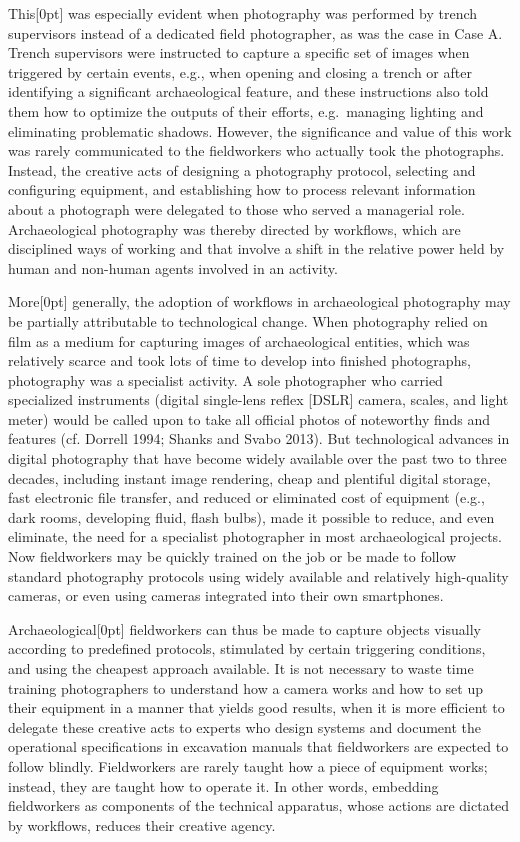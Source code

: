 \documentclass[
]{article}
\newcommand{\paragraphnumber}[1]{\marginnote{\color{lightgray}\tiny{#1}}[0pt]}
\begin{document}
This\paragraphnumber{[59]} was especially evident when photography was
performed by trench supervisors instead of a dedicated field
photographer, as was the case in Case A. Trench supervisors were
instructed to capture a specific set of images when triggered by certain
events, e.g., when opening and closing a trench or after identifying a
significant archaeological feature, and these instructions also told
them how to optimize the outputs of their efforts, e.g.~managing
lighting and eliminating problematic shadows. However, the significance
and value of this work was rarely communicated to the fieldworkers who
actually took the photographs. Instead, the creative acts of designing a
photography protocol, selecting and configuring equipment, and
establishing how to process relevant information about a photograph were
delegated to those who served a managerial role. Archaeological
photography was thereby directed by workflows, which are disciplined
ways of working and that involve a shift in the relative power held by
human and non-human agents involved in an activity.

More\paragraphnumber{[60]} generally, the adoption of workflows in
archaeological photography may be partially attributable to
technological change. When photography relied on film as a medium for
capturing images of archaeological entities, which was relatively scarce
and took lots of time to develop into finished photographs, photography
was a specialist activity. A sole photographer who carried specialized
instruments (digital single-lens reflex {[}DSLR{]} camera, scales, and
light meter) would be called upon to take all official photos of
noteworthy finds and features (cf. Dorrell 1994; Shanks and Svabo 2013).
But technological advances in digital photography that have become
widely available over the past two to three decades, including instant
image rendering, cheap and plentiful digital storage, fast electronic
file transfer, and reduced or eliminated cost of equipment (e.g., dark
rooms, developing fluid, flash bulbs), made it possible to reduce, and
even eliminate, the need for a specialist photographer in most
archaeological projects. Now fieldworkers may be quickly trained on the
job or be made to follow standard photography protocols using widely
available and relatively high-quality cameras, or even using cameras
integrated into their own smartphones.

Archaeological\paragraphnumber{[61]} fieldworkers can thus be made to
capture objects visually according to predefined protocols, stimulated
by certain triggering conditions, and using the cheapest approach
available. It is not necessary to waste time training photographers to
understand how a camera works and how to set up their equipment in a
manner that yields good results, when it is more efficient to delegate
these creative acts to experts who design systems and document the
operational specifications in excavation manuals that fieldworkers are
expected to follow blindly. Fieldworkers are rarely taught how a piece
of equipment works; instead, they are taught how to operate it. In other
words, embedding fieldworkers as components of the technical apparatus,
whose actions are dictated by workflows, reduces their creative agency.
\end{document}
